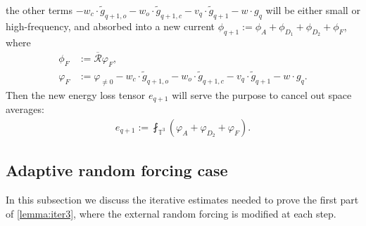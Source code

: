 \documentclass[10pt,a4paper]{amsart}
\numberwithin{equation}{section}
\numberwithin{corollario}{section}
\numberwithin{lemma}{section}
\numberwithin{prop}{section}
\theoremstyle{definition}
\theoremstyle{remark}
\newcommand{\T}{\mathbb{T}}
\newcommand{\qq}{_{q+1}}
\begin{document}
the other terms $-w_c \cdot \tilde{g}_{q+1,o}-w_o \cdot \tilde{g}_{q+1,c}- v_q \cdot \tilde{g}_{q+1}- w \cdot {g}_{q}$ will be either small or high-frequency, and absorbed into a new current $\phi\qq := \phi_A +  \phi_{D_1}+ \phi_{D_2}+ \phi_F$, where 
\begin{align}
    \phi_F &:= \overline{\mathcal{R}} \varphi_F,
    \\
    \varphi_F &:= \varphi_{\neq 0} -w_c \cdot \tilde{g}_{q+1,o}-w_o \cdot \tilde{g}_{q+1,c}- v_q \cdot \tilde{g}_{q+1}- w \cdot {g}_{q}.
\end{align}
Then the new energy loss tensor $e\qq$ will serve the purpose to cancel out space averages:
\begin{align}
   e\qq := \fint_{\T^3} \left( \varphi_A +\varphi_{D_2} +\varphi_F  \right). 
\end{align}

\subsection{Adaptive random forcing case}
In this subsection we discuss the iterative estimates needed to prove the first part of \autoref{lemma:iter3}, where the external random forcing is modified at each step.
\end{document}

